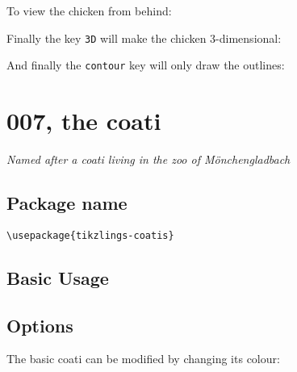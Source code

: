 \documentclass[parskip=half]{scrartcl}
\begin{document}
To view the chicken from behind:
\begin{tcblisting}{}
\chicken[back]
\end{tcblisting}

Finally the key \lstinline|3D| will make the chicken 3-dimensional:
\begin{tcblisting}{}
\chicken[3D]
\end{tcblisting}

And finally the \lstinline|contour| key will only draw the outlines:
\begin{tcblisting}{}
\chicken[contour=black]
\end{tcblisting}

%
%
\clearpage
\section[Coati]{007, the coati}

\emph{Named after a coati living in the zoo of M\"onchengladbach}

\subsection{Package name}

\begin{tcolorbox}[lower separated=false, lefthand width=.8\linewidth]
\vspace*{0.5cm}
\lstinline|\usepackage{tikzlings-coatis}| 
\vspace*{0.5cm}
\end{tcolorbox}

\subsection{Basic Usage}

\begin{tcblisting}{}
\coati
\end{tcblisting}

\subsection{Options}

The basic coati can be modified by changing its colour:
\begin{tcblisting}{}
\coati[body=blue]
\end{tcblisting}
\end{document}
